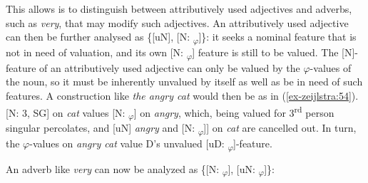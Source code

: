 \documentclass[output=paper
,modfonts
,nonflat]{langsci/langscibook}
\begin{document}
This allows is to distinguish between attributively used adjectives and adverbs, such as \textit{very}, that may modify such adjectives. An attributively used adjective can then be further analysed as \{[uN], [N: \ul{}\textsubscript{$\varphi$}]\}: it seeks a nominal feature that is not in need of valuation, and its own [N: \ul{}\textsubscript{$\varphi$}] feature is still to be valued. The [N]-feature of an attributively used adjective can only be valued by the $\varphi$-values of the noun, so it must be inherently unvalued by itself as well as be in need of such features. A construction like \textit{the angry cat} would then be as in (\ref{ex-zeijlstra:54}). [N: 3, SG] on \textit{cat} values [N: \ul{}\textsubscript{$\varphi$}] on \textit{angry}, which, being valued for 3\textsuperscript{rd} person singular percolates, and [uN] \textit{angry} and [N: \ul{}\textsubscript{$\varphi$}]] on \textit{cat} are cancelled out. In turn, the $\varphi$-values on \textit{angry cat} value D’s unvalued [uD: \ul{}\textsubscript{$\varphi$}]-feature.


\begin{figure}[!h]
\begin{exe}
\end{exe} \vspace{-0.75cm}
\end{figure}
 \noindent An adverb like \textit{very} can now be analyzed as \{[N: \ul{}\textsubscript{$\varphi$}], [uN: \ul{}\textsubscript{$\varphi$}]\}: 
\end{document}
